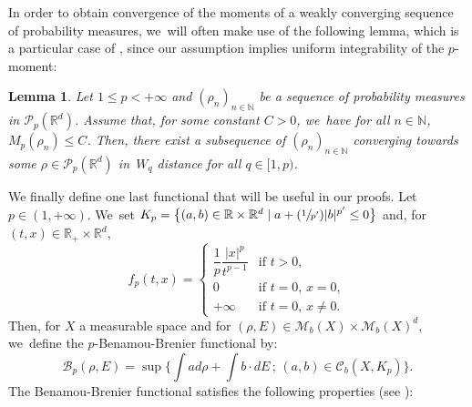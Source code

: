 \documentclass[JEP,XML,SOM,Unicode, NoFloatCountersInSection,published]{cedram}
\newcommand{\Psfrac}[2]{(\sfrac{#1}{#2})}
\def\NN{\mathbb{N}}
\def\RR{\mathbb{R}}
\def\calB{{\mathcal B}}
\def\calC{{\mathcal C}}
\def\calM{{\mathcal M}}
\def\calP{{\mathcal P}}
\theoremstyle{plain}
\newtheorem{lemma}[theorem]{Lemma}
\theoremstyle{definition}
\begin{document}
In order to obtain convergence of the moments of a weakly converging sequence of probability measures, we~will often make use of the following lemma, which is a particular case of \cite[Prop.\,7.1.5]{ambrosio08}, since our assumption implies uniform integrability of the $p$-moment:
\begin{lemma}\label{lemma:boundedWpImpliesCompactWq}
Let $1 \leq p < +\infty$ and $(\rho_n)_{n \in \NN}$ be a sequence of probability measures in $\calP_p(\RR^d)$.
Assume that, for some constant $C>0$, we~have for all $n \in \NN$, $M_p(\rho_n) \leq C$.
Then, there exist a subsequence of $(\rho_n)_{n \in \NN}$ converging towards some $\rho \in \calP_p(\RR^d)$ in~$W_q$ distance for all $q \in [1,p)$.
\end{lemma}

We finally define one last functional that will be useful in our proofs. Let $p \in (1, +\infty)$. We~set $K_p = \bigl\lbrace (a,b) \in \RR \times \RR^d \mid a + \Psfrac{1}{p'} |b|^{p'} \leq 0 \bigr\rbrace$ and, for $(t,x) \in \RR_+ \times \RR^d$,
\[
f_p(t,x) = \begin{cases}
\dfrac{1}{p} \dfrac{|x|^p}{t^{p-1}} & \text{if } t>0, \\
0 & \text{if } t=0, \, x=0, \\
+\infty & \text{if } t=0, \, x \neq 0.
\end{cases}
\]
Then, for $X$ a measurable space and for $(\rho, E) \in \calM_b(X) \times \calM_b(X)^d$, we~define the $p$-Benamou-Brenier functional by:
\[
\calB_p(\rho, E) = \sup \biggl\lbrace \int a d\rho + \int b \cdot dE \,; \, (a,b) \in \calC_b(X, K_p) \biggr\rbrace.
\]
The Benamou-Brenier functional satisfies the following properties (see \cite[Prop.\,5.18]{otam15}):
\end{document}
